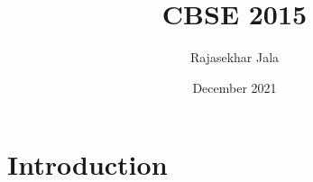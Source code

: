\documentclass{article}
\title{CBSE 2015}
\author{Rajasekhar Jala}
\date{December 2021}
\begin{document}
\maketitle

\section{Introduction}
\end{document}
